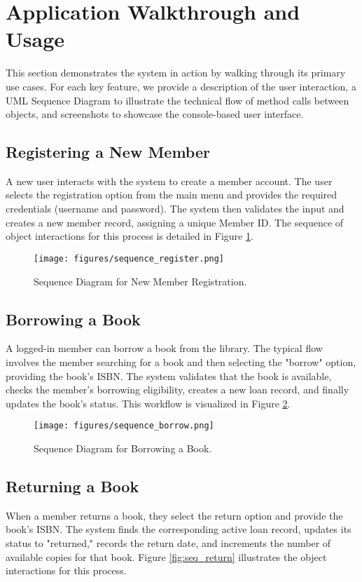 \section{Application Walkthrough and Usage}
\label{sec:walkthrough}

This section demonstrates the system in action by walking through its primary use cases. For each key feature, we provide a description of the user interaction, a UML Sequence Diagram to illustrate the technical flow of method calls between objects, and screenshots to showcase the console-based user interface.

\subsection{Registering a New Member}
A new user interacts with the system to create a member account. The user selects the registration option from the main menu and provides the required credentials (username and password). The system then validates the input and creates a new member record, assigning a unique Member ID. The sequence of object interactions for this process is detailed in Figure \ref{fig:seq_register}.

\begin{figure}[H]
    \centering
    \texttt{[image: figures/sequence\_register.png]}
    \caption{Sequence Diagram for New Member Registration.}
    \label{fig:seq_register}
\end{figure}

\subsection{Borrowing a Book}
A logged-in member can borrow a book from the library. The typical flow involves the member searching for a book and then selecting the "borrow" option, providing the book's ISBN. The system validates that the book is available, checks the member's borrowing eligibility, creates a new loan record, and finally updates the book's status. This workflow is visualized in Figure \ref{fig:seq_borrow}.

\begin{figure}[H]
    \centering
    \texttt{[image: figures/sequence\_borrow.png]}
    \caption{Sequence Diagram for Borrowing a Book.}
    \label{fig:seq_borrow}
\end{figure}

\subsection{Returning a Book}
When a member returns a book, they select the return option and provide the book's ISBN. The system finds the corresponding active loan record, updates its status to "returned," records the return date, and increments the number of available copies for that book. Figure \ref{fig:seq_return} illustrates the object interactions for this process.

